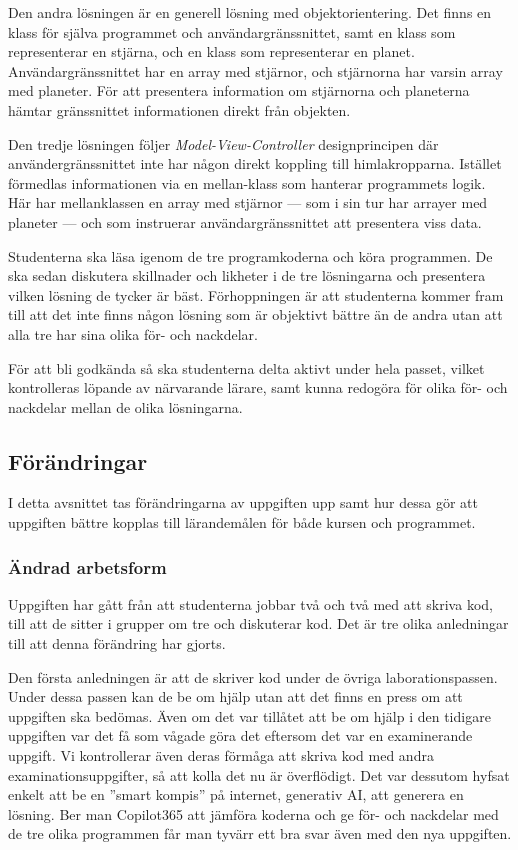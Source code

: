 \documentclass[a4paper, 10pt]{article}
\begin{document}
Den andra lösningen är en generell lösning 
med objektorientering. Det finns en klass 
för själva programmet och användargränssnittet, 
samt en klass som representerar en stjärna, 
och en klass som representerar en planet. 
Användargränssnittet har en array med stjärnor,
och stjärnorna har varsin array med planeter. 
För att presentera information om stjärnorna 
och planeterna hämtar gränssnittet informationen 
direkt från objekten.

Den tredje lösningen följer 
\textit{Model-View-Controller} designprincipen
där användergränssnittet inte har någon direkt 
koppling till himlakropparna. Istället 
förmedlas informationen via en mellan-klass som 
hanterar programmets logik. Här har mellanklassen
en array med stjärnor --- som i sin tur har arrayer
med planeter --- och som instruerar 
användargränssnittet att presentera viss data.

Studenterna ska läsa igenom de tre programkoderna
och köra programmen. De ska sedan diskutera 
skillnader och likheter i de tre lösningarna och 
presentera vilken lösning de tycker är bäst.
Förhoppningen är att studenterna kommer fram till 
att det inte finns någon lösning som är objektivt
bättre än de andra utan att alla tre har sina 
olika för- och nackdelar.

För att bli godkända så ska studenterna delta 
aktivt under hela passet, vilket kontrolleras 
löpande av närvarande lärare, samt kunna redogöra 
för olika för- och nackdelar mellan de olika 
lösningarna.

\subsection{Förändringar}

I detta avsnittet tas förändringarna av uppgiften 
upp samt hur dessa gör att uppgiften bättre 
kopplas till lärandemålen för både kursen och 
programmet. 

\subsubsection{Ändrad arbetsform}

Uppgiften har gått från att studenterna jobbar
två och två med att skriva kod, till att de 
sitter i grupper om tre och diskuterar kod.
Det är tre olika anledningar till att denna 
förändring har gjorts.

Den första anledningen är att de skriver kod 
under de övriga laborationspassen. Under dessa 
passen kan de be om hjälp utan att det finns en 
press om att uppgiften ska bedömas. Även om 
det var tillåtet att be om hjälp i den tidigare 
uppgiften var det få som vågade göra det 
eftersom det var en examinerande uppgift. Vi 
kontrollerar även deras förmåga att skriva kod
med andra examinationsuppgifter, så att kolla 
det nu är överflödigt. Det var dessutom 
hyfsat enkelt att be en ''smart kompis'' på 
internet, generativ AI, att generera en lösning.
Ber man Copilot365 att jämföra koderna och ge 
för- och nackdelar med de tre olika programmen 
får man tyvärr ett bra svar även med den nya 
uppgiften.
\end{document}
